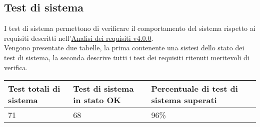 \documentclass{scalatekids-article}
\begin{document}
\subsection{Test di sistema}

I test di sistema permettono di verificare il comportamento del sistema rispetto ai requisiti descritti nell'\href{run:./AnalisiDeiRequisiti\_v4.0.0.pdf}{Analisi dei requisiti v4.0.0}.\\
Vengono presentate due tabelle, la prima contenente una sistesi dello stato dei 
test di sistema, la seconda descrive tutti i test dei requisiti ritenuti meritevoli di verifica. \\

\begin{center}
  \begin{longtable}[H]{| l | l | l |}
    \hline
    Test totali di sistema & Test di sistema in stato OK & Percentuale di test di sistema superati\\
    \hline
    71 & 68 & 96\% \\
    \hline
  \end{longtable}
\end{center}
\end{document}
